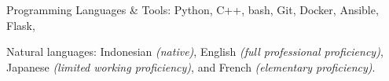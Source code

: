 \documentclass[10pt,letterpaper]{article}
\begin{document}
\inlineheadsection
  {Programming Languages \& Tools:}
  {Python, C++, bash, Git, Docker, Ansible, Flask, }
\vspace{0.5em}

\inlineheadsection
  {Natural languages:}
  {Indonesian \textit{(native)}, English \textit{(full professional proficiency)}, Japanese \textit{(limited working proficiency)}, and French \textit{(elementary proficiency)}.}

%
%
\end{document}
